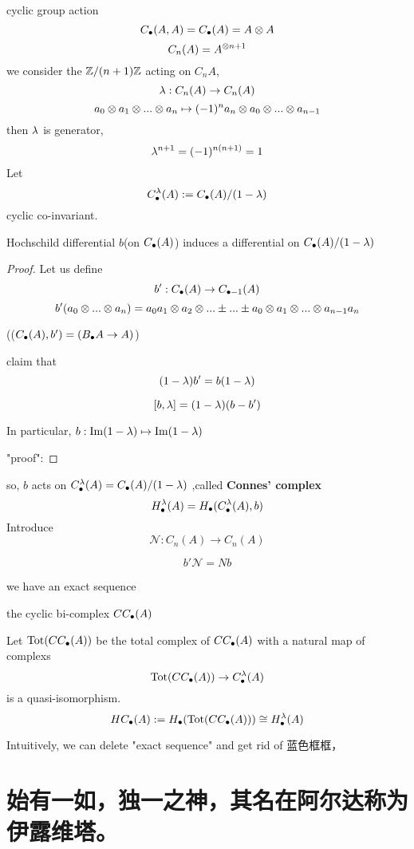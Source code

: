 cyclic group action
$$C_{\bullet}(A,A)=C_{\bullet}(A)=A\otimes A$$
$$C_n(A)=A^{\otimes n+1}$$
we consider the $\mathbb{Z}/(n+1)\mathbb{Z}$ acting on $C_n A$,
$$\lambda: C_n(A)\to C_n(A)$$
$$a_0\otimes a_1\otimes...\otimes a_n\mapsto
(-1)^na_n
\otimes a_0\otimes...\otimes a_{n-1}$$
then $\lambda$ is generator,
$$\lambda^{n+1}=(-1)^{n(n+1)}=1$$
Let
$$C^{\lambda}_{\bullet}(A):=C_{\bullet}(A)/(1-\lambda)$$
cyclic co-invariant.

\begin{prop}
Hochschild differential $b$(on $C_{\bullet}(A)$) induces a
differential on $C_{\bullet}(A)/(1-\lambda)$
\end{prop}
\begin{proof}
Let us define
$$b':C_{\bullet}(A)\to C_{\bullet-1}(A)$$
$$b'(a_0\otimes...\otimes a_n)
=a_0a_1\otimes a_2\otimes...\pm...\pm a_0\otimes a_1\otimes...\otimes a_{n-1}a_n$$

(($C_{\bullet}(A),b')=(B_{\bullet} A\to A)$)

claim that
$$(1-\lambda)b'=b(1-\lambda)$$

$$[b,\lambda]=(1-\lambda)(b-b')$$

In particular, $b:\operatorname{Im}(1-\lambda)\mapsto\operatorname{Im}(1-\lambda)$

"proof":


\end{proof}

so, $b$ acts on $C^{\lambda}_{\bullet}(A)=C_{\bullet}(A)/(1-\lambda)$
,called \textbf{Connes' complex}
$$H^{\lambda}_{\bullet}(A)=H_{\bullet}(C^{\lambda}_{\bullet}(A),b)$$
Introduce
$$\mathcal{N}:C_n(A)\to C_n(A)$$

\begin{prop}
$$b'\mathcal{N}=Nb$$
\end{prop}

we have an exact sequence

\begin{definition}
the cyclic bi-complex $CC_{\bullet}(A)$
\end{definition}

Let $\text{Tot}(CC_{\bullet}(A))$ be the total complex of $CC_{\bullet}(A)$
with a natural map of complexs
$$\text{Tot}(CC_{\bullet}(A))\to C^{\lambda}_{\bullet}(A)$$
is a quasi-isomorphism.
$$HC_{\bullet}(A):=H_{\bullet}(\text{Tot}(CC_{\bullet}(A)))
\cong H^{\lambda}_{\bullet}(A)$$

Intuitively, we can delete "exact sequence" and get rid of 蓝色框框，


\section{始有一如，独一之神，其名在阿尔达称为伊露维塔。}

